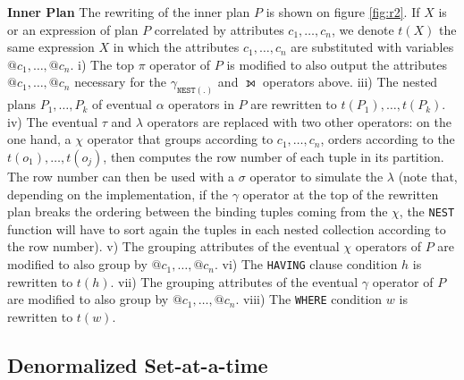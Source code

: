 \textbf{Inner Plan} The rewriting of the inner plan $P$ is shown on figure \ref{fig:r2}. If $X$ is or an expression of plan $P$ correlated by attributes $c_1, \dots, c_n$, we denote $t(X)$ the same expression $X$ in which the attributes $c_1, \dots, c_n$ are substituted with variables $@c_1, \dots, @c_n$. i) The top $\pi$ operator of $P$ is modified to also output the attributes $@c_1, \dots, @c_n$ necessary for the $\gamma_{\texttt{NEST}(.)}$ and $\leftouterjoin$ operators above. iii) The nested plans $P_1, \dots, P_k$ of eventual $\alpha$ operators in $P$ are rewritten to $t(P_1), \dots, t(P_k)$. iv) The eventual $\tau$ and $\lambda$ operators are replaced with two other operators: on the one hand, a $\chi$ operator that groups according to $c_1, \dots, c_n$, orders according to the $t(o_1), \dots, t(o_j)$, then computes the row number of each tuple in its partition. The row number can then be used with a $\sigma$ operator to simulate the $\lambda$ (note that, depending on the implementation, if the $\gamma$ operator at the top of the rewritten plan breaks the ordering between the binding tuples coming from the $\chi$, the \texttt{NEST} function will have to sort again the tuples in each nested collection according to the row number). v) The grouping attributes of the eventual $\chi$ operators of $P$ are modified to also group by $@c_1, \dots, @c_n$. vi) The \texttt{HAVING} clause condition $h$ is rewritten to $t(h)$. vii) The grouping attributes of the eventual $\gamma$ operator of $P$ are modified to also group by $@c_1, \dots, @c_n$. viii) The \texttt{WHERE} condition $w$ is rewritten to $t(w)$.


\subsection{Denormalized Set-at-a-time}

